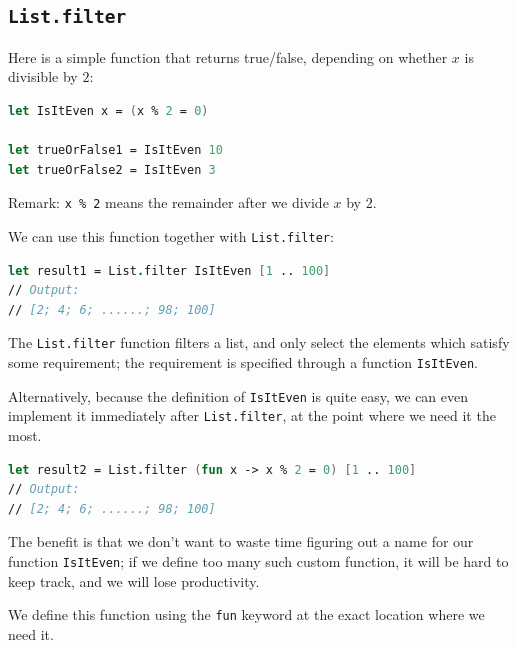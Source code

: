 \documentclass[12pt]{article}
\begin{document}
\pagebreak

\subsection{\texttt{List.filter}}
Here is a simple function that returns true/false, depending on whether $x$ is divisible by $2$:
\begin{lstlisting}[language=FSharp]
let IsItEven x = (x % 2 = 0)

let trueOrFalse1 = IsItEven 10
let trueOrFalse2 = IsItEven 3
\end{lstlisting}
Remark: \texttt{x \% 2} means the remainder after we divide $x$ by $2$.

We can use this function together with \texttt{List.filter}:
\begin{lstlisting}[language=FSharp]
let result1 = List.filter IsItEven [1 .. 100]
// Output:
// [2; 4; 6; ......; 98; 100]
\end{lstlisting}
The \texttt{List.filter} function filters a list, and only select the elements which satisfy some requirement; the requirement is specified through a function \texttt{IsItEven}.

Alternatively, because the definition of \texttt{IsItEven} is quite easy, we can even implement it immediately after \texttt{List.filter}, at the point where we need it the most.
\begin{lstlisting}[language=FSharp]
let result2 = List.filter (fun x -> x % 2 = 0) [1 .. 100]
// Output:
// [2; 4; 6; ......; 98; 100]
\end{lstlisting}
The benefit is that we don't want to waste time figuring out a name for our function \texttt{IsItEven}; if we define too many such custom function, it will be hard to keep track, and we will lose productivity.

We define this function using the \texttt{fun} keyword at the exact location where we need it.

\pagebreak
\end{document}
